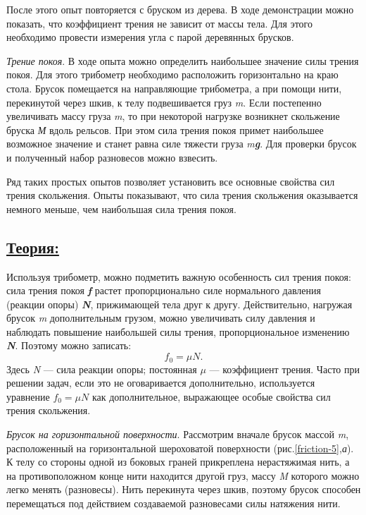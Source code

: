 \documentclass[14pt,a4paper,oneside]{extarticle}	%
\begin{document}
	После этого опыт повторяется с бруском из дерева.
	В ходе демонстрации можно показать, что коэффициент трения не зависит от массы тела.
	Для этого необходимо провести измерения угла с парой деревянных брусков.
	
	\textit{Трение покоя}.	
    В ходе опыта можно определить наибольшее значение силы трения покоя.
    Для этого трибометр необходимо расположить горизонтально на краю стола.
    Брусок помещается на направляющие трибометра, а при помощи нити, перекинутой через шкив, к телу подвешивается груз \textit{m}.
	Если постепенно увеличивать массу груза \textit{m}, то при некоторой нагрузке возникнет скольжение бруска \textit{М} вдоль рельсов. 
	При этом сила трения покоя примет наибольшее возможное значение и станет равна 
	силе тяжести груза \textit{m\textbf{g}}.
	Для проверки брусок и полученный набор разновесов можно взвесить.
	
	Ряд таких простых опытов позволяет установить все основные 
	свойства сил трения скольжения. 
	Опыты показывают, что сила трения скольжения оказывается немного меньше, чем наибольшая 
	сила трения покоя. 

	\newpage	
	\subsection*{\underline{Теория:}}
	
	Используя трибометр, можно подметить важную особенность сил трения покоя: сила трения покоя \textit{\textbf{f}} растет пропорционально силе нормального давления (реакции опоры)
	\textit{\textbf{N}}, прижимающей тела друг к другу. 
	Действительно, нагружая брусок \textit{m} дополнительным грузом, можно увеличивать 
	силу давления и наблюдать повышение наибольшей силы трения, пропорциональное изменению \textit{\textbf{N}}. 
	Поэтому можно записать: 
	\begin{equation}\label{friction-4eq1}
	f_0  = \mu N.
	\end{equation}
	Здесь \textit{N} — сила реакции опоры; постоянная $ \mu $ — коэффициент трения.
	Часто при решении задач, если это не оговаривается дополнительно, используется уравнение $ f_0 = \mu N $ как дополнительное, выражающее особые свойства сил трения скольжения. 

\textit{Брусок на горизонтальной поверхности}.
Рассмотрим вначале брусок массой \textit{m}, расположенный на горизонтальной шероховатой поверхности (рис.\ref{friction-5},\textit{а}).
К телу со стороны одной из боковых граней прикреплена нерастяжимая нить, а на противоположном конце нити находится другой груз, массу \textit{M} которого можно легко менять (разновесы).
Нить перекинута через шкив, поэтому брусок способен перемещаться под действием создаваемой разновесами силы натяжения нити.
\end{document}
